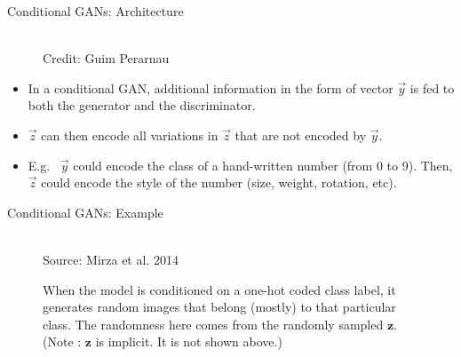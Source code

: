 \begin{frame} {Conditional GANs: Architecture}
  \begin{figure}
    \centering
      \tiny{\\Credit: Guim Perarnau}
  \end{figure}
  \begin{itemize}
    \item In a conditional GAN, additional information in the form of vector $\vec y$  is fed to both the generator and the discriminator.
    \item $\vec z$  can then encode all  variations in $\vec z$ that are not encoded by $\vec y$.
    \item E.g.~ $\vec y$ could encode the class of a hand-written number (from 0 to 9). Then,  $\vec z$ could encode  the style of the number (size, weight, rotation, etc).
  \end{itemize}
\end{frame}


\begin{frame} {Conditional GANs: Example}
  \vspace{10mm}
  \begin{figure}
    \centering
      \tiny{\\Source: Mirza et al. 2014}
      \caption{\footnotesize When the model is conditioned on a one-hot coded class label, it generates random images that belong (mostly) to that particular class. The randomness here comes from the randomly sampled $\mathbf{z}$. (Note : $\mathbf{z}$ is implicit. It is not shown above.)}
  \end{figure}
\end{frame}

